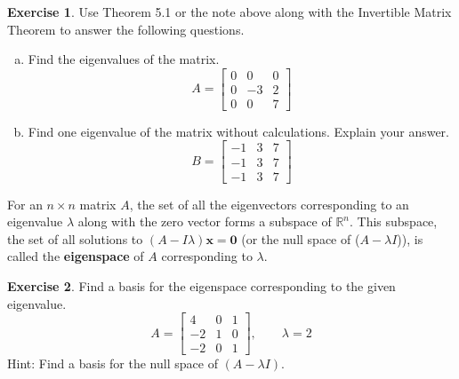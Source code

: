\documentclass[10pt]{book}
\newcommand{\boxcolor}{gray!30}
\newenvironment{boxme}{\begin{mdframed}[backgroundcolor=\boxcolor,linewidth=0pt,nobreak=true]}{\end{mdframed}}
\theoremstyle{definition}
\newtheorem{exercise}{Exercise}[section]
\newcommand{\R}{\mathbb{R}}
\newcommand{\vect}[1]{\ensuremath{\boldsymbol{\mathbf{#1}}}}
\begin{document}
\begin{exercise} %
	Use Theorem 5.1 or the note above along with the Invertible Matrix Theorem to answer the following questions.
	\begin{multicols}{2}
		\begin{enumerate}[(a)]
			\item Find the eigenvalues of the matrix.
			$$A=\begin{bmatrix}0&0&0\\0&-3&2\\0&0&7\end{bmatrix}$$
			\columnbreak 
			\item Find one eigenvalue of the matrix without calculations. Explain your answer.
			$$B=\begin{bmatrix}-1&3&7\\-1&3&7\\-1&3&7\end{bmatrix}$$
		\end{enumerate}
	\end{multicols}
\end{exercise}
\vfill


\begin{boxme}
	For an $n\times n$ matrix $A$, the set of all the eigenvectors corresponding to an eigenvalue $\lambda$ along with the zero vector forms a subspace of $\R^n$. This subspace, the set of all solutions to $(A-I\lambda)\vect{x}=\vect{0}$ (or the null space of ($A-\lambda I$)), is called the \textbf{eigenspace} of $A$ corresponding to $\lambda$.
\end{boxme}

\begin{exercise} %
	Find a basis for the eigenspace corresponding to the given eigenvalue.
	$$ A = \begin{bmatrix}4&0&1\\-2&1&0\\-2&0&1\end{bmatrix}, \qquad \lambda = 2 $$
	Hint: Find a basis for the null space of $(A-\lambda I)$.
\end{exercise}
\vfill

\end{document}
